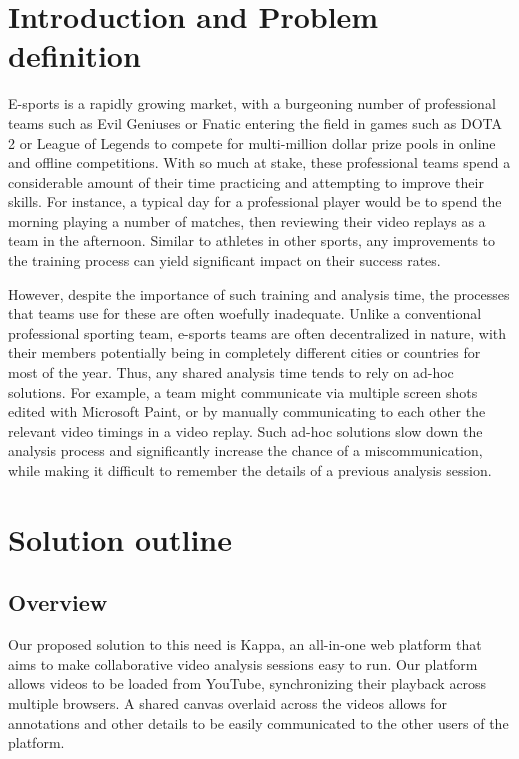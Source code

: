 \documentclass[conference]{IEEEtran}
\begin{document}
\section{Introduction and Problem definition}

  E-sports is a rapidly growing market, with a burgeoning number of professional teams such as Evil Geniuses or Fnatic entering the field in games such as DOTA 2 or League of Legends to compete for multi-million dollar prize pools in online and offline competitions. With so much at stake, these professional teams spend a considerable amount of their time practicing and attempting to improve their skills. For instance, a typical day for a professional player would be to spend the morning playing a number of matches, then reviewing their video replays as a team in the afternoon. Similar to athletes in other sports, any improvements to the training process can yield significant impact on their success rates.

  However, despite the importance of such training and analysis time, the processes that teams use for these are often woefully inadequate. Unlike a conventional professional sporting team, e-sports teams are often decentralized in nature, with their members potentially being in completely different cities or countries for most of the year. Thus, any shared analysis time tends to rely on ad-hoc solutions. For example, a team might communicate via multiple screen shots edited with Microsoft Paint, or by manually communicating to each other the relevant video timings in a video replay. Such ad-hoc solutions slow down the analysis process and significantly increase the chance of a miscommunication, while making it difficult to remember the details of a previous analysis session.

\section{Solution outline}

\subsection{Overview}

  Our proposed solution to this need is Kappa, an all-in-one web platform that aims to make collaborative video analysis sessions easy to run. Our platform allows videos to be loaded from YouTube, synchronizing their playback across multiple browsers. A shared canvas overlaid across the videos allows for annotations and other details to be easily communicated to the other users of the platform.
\end{document}
